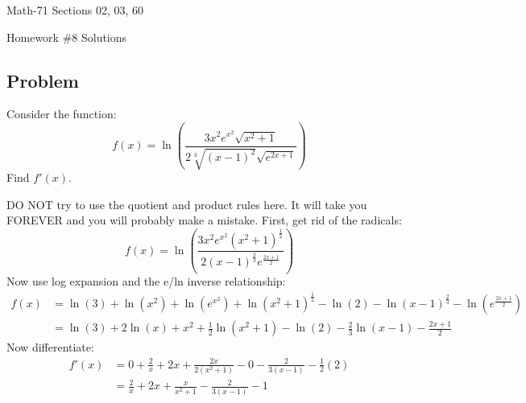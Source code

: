 \documentclass[letterpaper,12pt,fleqn]{article}
\begin{document}
\begin{center}
  \large
  Math-71 Sections 02, 03, 60

  \Large
  Homework \#8 Solutions
\end{center}

\subsection*{Problem}

Consider the function:
\[f(x)=\ln\left(\frac{3x^2e^{x^2}\sqrt{x^2+1}}{2\sqrt[3]{(x-1)^2}\sqrt{e^{2x+1}}}\right)\]
Find \(f'(x)\).

DO NOT try to use the quotient and product rules here.  It will take you FOREVER and you will probably make a
mistake.  First, get rid of the radicals:
\[f(x)=\ln\left(\frac{3x^2e^{x^2}(x^2+1)^{\frac{1}{2}}}{2(x-1)^{\frac{2}{3}}e^{\frac{2x+1}{2}}}\right)\]
Now use log expansion and the e/ln inverse relationship:
\begin{align*}
  f(x) &= \ln(3)+\ln\left(x^2\right)+\ln\left(e^{x^2}\right)+\ln\left(x^2+1\right)^{\frac{1}{2}}-
  \ln(2)-\ln(x-1)^{\frac{2}{3}}-\ln\left(e^{\frac{2x+1}{2}}\right) \\
  &= \ln(3)+2\ln(x)+x^2+\frac{1}{2}\ln\left(x^2+1\right)-\ln(2)-\frac{2}{3}\ln(x-1)-\frac{2x+1}{2}
\end{align*}
Now differentiate:
\begin{align*}
  f'(x) &= 0+\frac{2}{x}+2x+\frac{2x}{2(x^2+1)}-0-\frac{2}{3(x-1)}-\frac{1}{2}(2) \\
  &= \frac{2}{x}+2x+\frac{x}{x^2+1}-\frac{2}{3(x-1)}-1
\end{align*}
\end{document}
